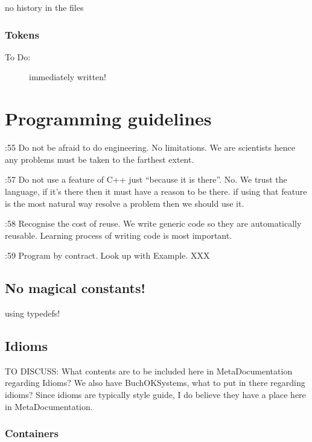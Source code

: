 \documentclass{book}
\begin{document}
no history in the files

\section{Tokens}

\begin{description}
\item[To Do:] immediately written!
\end{description}


\part{Programming guidelines}
\label{par:programmingguidelines}

\cite{OKL_MisfeldtBumgardnerGray2004CppStyle}:55 Do not be afraid to do engineering. No limitations. We are scientists hence any problems must be taken to the farthest extent.

\cite{OKL_MisfeldtBumgardnerGray2004CppStyle}:57 Do not use a feature of C++ just ``because it is there''. No. We trust the language, if it's there then it must have a reason to be there. if using that feature is the most natural way resolve a problem then we should use it.

\cite{OKL_MisfeldtBumgardnerGray2004CppStyle}:58 Recognise the cost of reuse. We write generic code so they are automatically reusable. Learning process of writing code is most important.

\cite{OKL_MisfeldtBumgardnerGray2004CppStyle}:59 Program by contract. Look up with Example. XXX
   
\chapter{No magical constants!}
\label{cha:magicconstants}

using typedefs!

\chapter{Idioms}
\label{cha:Idioms}

TO DISCUSS: What contents are to be included here in MetaDocumentation regarding Idioms? We also have BuchOKSystems, what to put in there regarding idioms? Since idioms are typically style guide, I do believe they have a place here in MetaDocumentation. 

\section{Containers}
\label{sec:container_idioms}
\end{document}
